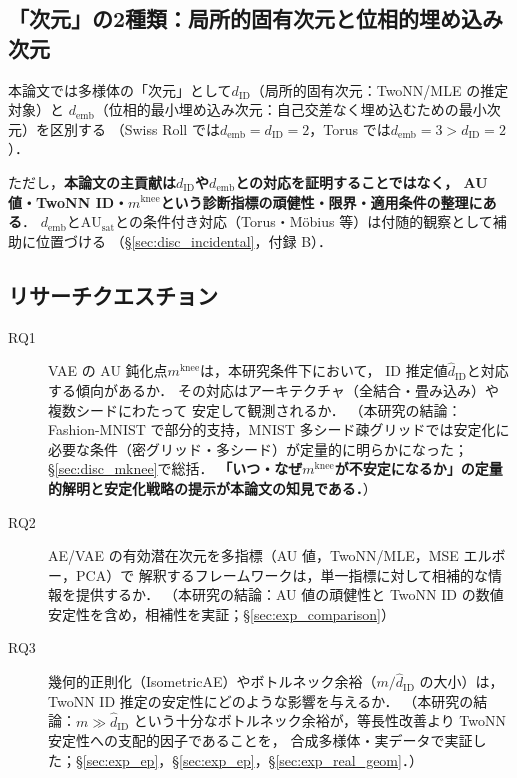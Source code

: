 \documentclass[11pt,a4paper]{jsarticle}
\newcommand{\dID}{d_{\mathrm{ID}}}
\newcommand{\AUsat}{\mathrm{AU}_{\mathrm{sat}}}
\newcommand{\mknee}{m^{\mathrm{knee}}}
\newcommand{\demb}{d_{\mathrm{emb}}}
\begin{document}
\subsection{「次元」の2種類：局所的固有次元と位相的埋め込み次元}\label{sec:intro_dim}

本論文では多様体の「次元」として$\dID$（局所的固有次元：TwoNN/MLE の推定対象）と
$\demb$（位相的最小埋め込み次元：自己交差なく埋め込むための最小次元）を区別する
（Swiss Roll では$\demb = \dID = 2$，Torus では$\demb = 3 > \dID = 2$）．

ただし，\textbf{本論文の主貢献は$\dID$や$\demb$との対応を証明することではなく，
AU 値・TwoNN ID・$\mknee$という診断指標の頑健性・限界・適用条件の整理にある}．
$\demb$と$\AUsat$との条件付き対応（Torus・Möbius 等）は付随的観察として補助に位置づける
（§\ref{sec:disc_incidental}，付録 B）．

\subsection{リサーチクエスチョン}\label{sec:intro_rq}

\begin{description}
  \item[RQ1] VAE の AU 鈍化点$\mknee$は，本研究条件下において，
             ID 推定値$\hat{d}_\mathrm{ID}$と対応する傾向があるか．
             その対応はアーキテクチャ（全結合・畳み込み）や複数シードにわたって
             安定して観測されるか．
             （本研究の結論：Fashion-MNIST で部分的支持，MNIST 多シード疎グリッドでは安定化に必要な条件（密グリッド・多シード）が定量的に明らかになった；
             §\ref{sec:disc_mknee}で総括．
             \textbf{「いつ・なぜ$\mknee$が不安定になるか」の定量的解明と安定化戦略の提示が本論文の知見である．}）
  \item[RQ2] AE/VAE の有効潜在次元を多指標（AU 値，TwoNN/MLE，MSE エルボー，PCA）で
             解釈するフレームワークは，単一指標に対して相補的な情報を提供するか．
             （本研究の結論：AU 値の頑健性と TwoNN ID の数値安定性を含め，相補性を実証；§\ref{sec:exp_comparison}）
  \item[RQ3] 幾何的正則化（IsometricAE）やボトルネック余裕（$m / \hat{d}_\mathrm{ID}$ の大小）は，
             TwoNN ID 推定の安定性にどのような影響を与えるか．
             （本研究の結論：$m \gg \hat{d}_\mathrm{ID}$ という十分なボトルネック余裕が，等長性改善より TwoNN 安定性への支配的因子であることを，
             合成多様体・実データで実証した；§\ref{sec:exp_ep}，§\ref{sec:exp_ep}，§\ref{sec:exp_real_geom}．）
\end{description}
\end{document}
